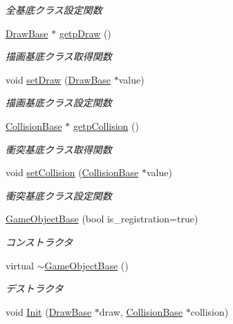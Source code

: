 \begin{DoxyCompactItemize}
\begin{DoxyCompactList}\small\item\em 全基底クラス設定関数 \end{DoxyCompactList}\item 
\mbox{\hyperlink{class_draw_base}{Draw\+Base}} $\ast$ \mbox{\hyperlink{class_game_object_base_a3f75b81c278bef3f58196c58e52aff98}{getp\+Draw}} ()
\begin{DoxyCompactList}\small\item\em 描画基底クラス取得関数 \end{DoxyCompactList}\item 
void \mbox{\hyperlink{class_game_object_base_ab771c9ebbca42ccc5ffdee4b3e2e47c5}{set\+Draw}} (\mbox{\hyperlink{class_draw_base}{Draw\+Base}} $\ast$value)
\begin{DoxyCompactList}\small\item\em 描画基底クラス設定関数 \end{DoxyCompactList}\item 
\mbox{\hyperlink{class_collision_base}{Collision\+Base}} $\ast$ \mbox{\hyperlink{class_game_object_base_a40170b972b0a0eb5637edaac211612e2}{getp\+Collision}} ()
\begin{DoxyCompactList}\small\item\em 衝突基底クラス取得関数 \end{DoxyCompactList}\item 
void \mbox{\hyperlink{class_game_object_base_acddc882ccdb78e47acb0d718d5e55f5d}{set\+Collision}} (\mbox{\hyperlink{class_collision_base}{Collision\+Base}} $\ast$value)
\begin{DoxyCompactList}\small\item\em 衝突基底クラス設定関数 \end{DoxyCompactList}\item 
\mbox{\hyperlink{class_game_object_base_a4682a3e88a45a462de288f14e9a8545d}{Game\+Object\+Base}} (bool is\+\_\+registration=true)
\begin{DoxyCompactList}\small\item\em コンストラクタ \end{DoxyCompactList}\item 
virtual \mbox{\hyperlink{class_game_object_base_a0cb813d5c7af673a3d190eb1b2d26275}{$\sim$\+Game\+Object\+Base}} ()
\begin{DoxyCompactList}\small\item\em デストラクタ \end{DoxyCompactList}\item 
void \mbox{\hyperlink{class_game_object_base_a96fe1a7816a3aef9a70cfcc39c032d2f}{Init}} (\mbox{\hyperlink{class_draw_base}{Draw\+Base}} $\ast$draw, \mbox{\hyperlink{class_collision_base}{Collision\+Base}} $\ast$collision)

\end{DoxyCompactItemize}
